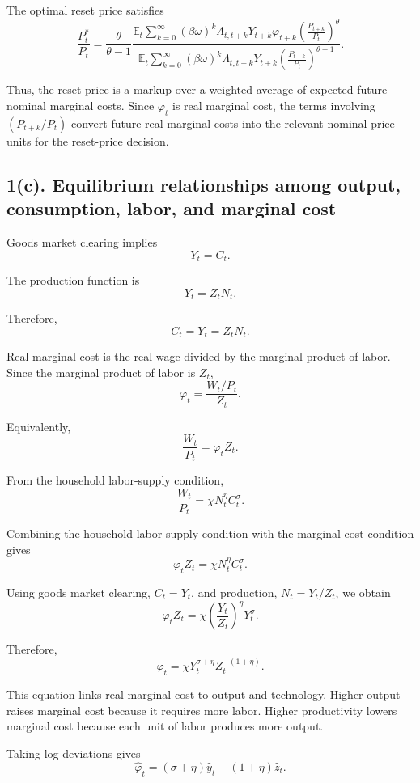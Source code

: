 \documentclass[12pt]{article}
\begin{document}
The optimal reset price satisfies
\[
\boxed{
\frac{P_t^*}{P_t}
=
\frac{\theta}{\theta-1}
\frac{
\mathbb{E}_t
\sum_{k=0}^{\infty}
(\beta\omega)^k
\Lambda_{t,t+k}
Y_{t+k}
\varphi_{t+k}
\left(\frac{P_{t+k}}{P_t}\right)^\theta
}{
\mathbb{E}_t
\sum_{k=0}^{\infty}
(\beta\omega)^k
\Lambda_{t,t+k}
Y_{t+k}
\left(\frac{P_{t+k}}{P_t}\right)^{\theta-1}
}.
}
\]

Thus, the reset price is a markup over a weighted average of expected future nominal marginal costs. Since $\varphi_t$ is real marginal cost, the terms involving $\left(P_{t+k}/P_t\right)$ convert future real marginal costs into the relevant nominal-price units for the reset-price decision.

\subsection*{1(c). Equilibrium relationships among output, consumption, labor, and marginal cost}

Goods market clearing implies
\[
Y_t=C_t.
\]

The production function is
\[
Y_t=Z_tN_t.
\]

Therefore,
\[
C_t=Y_t=Z_tN_t.
\]

Real marginal cost is the real wage divided by the marginal product of labor. Since the marginal product of labor is $Z_t$,
\[
\boxed{
\varphi_t
=
\frac{W_t/P_t}{Z_t}.
}
\]

Equivalently,
\[
\boxed{
\frac{W_t}{P_t}
=
\varphi_t Z_t.
}
\]

From the household labor-supply condition,
\[
\frac{W_t}{P_t}
=
\chi N_t^\eta C_t^\sigma.
\]

Combining the household labor-supply condition with the marginal-cost condition gives
\[
\boxed{
\varphi_t Z_t
=
\chi N_t^\eta C_t^\sigma.
}
\]

Using goods market clearing, $C_t=Y_t$, and production, $N_t=Y_t/Z_t$, we obtain
\[
\varphi_t Z_t
=
\chi
\left(
\frac{Y_t}{Z_t}
\right)^\eta
Y_t^\sigma.
\]

Therefore,
\[
\boxed{
\varphi_t
=
\chi
Y_t^{\sigma+\eta}
Z_t^{-(1+\eta)}.
}
\]

This equation links real marginal cost to output and technology. Higher output raises marginal cost because it requires more labor. Higher productivity lowers marginal cost because each unit of labor produces more output.

Taking log deviations gives
\[
\boxed{
\hat{\varphi}_t
=
(\sigma+\eta)\hat{y}_t
-
(1+\eta)\hat{z}_t.
}
\]
\end{document}
